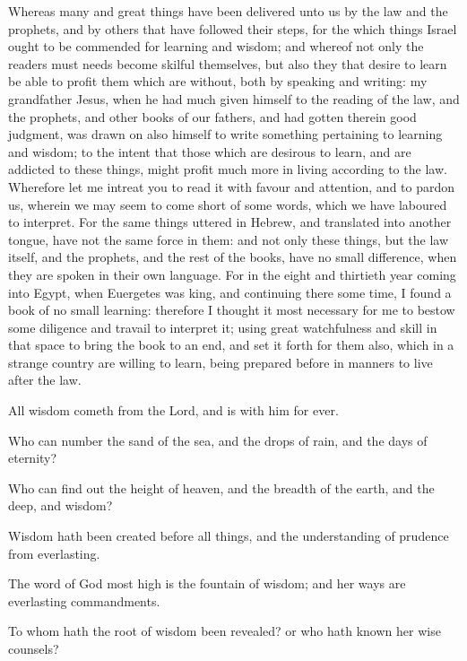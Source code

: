 {\par }{\PP Whereas many and great things have been delivered unto us by the law and the prophets, and by others that have followed their steps, for the which things Israel ought to be commended for learning and wisdom; and whereof not only the readers must needs become skilful themselves, but also they that desire to learn be able to profit them which are without, both by speaking and writing: my grandfather Jesus, when he had much given himself to the reading of the law, and the prophets, and other books of our fathers, and had gotten therein good judgment, was drawn on also himself to write something pertaining to learning and wisdom; to the intent that those which are desirous to learn, and are addicted to these things, might profit much more in living according to the law. Wherefore let me intreat you to read it with favour and attention, and to pardon us, wherein we may seem to come short of some words, which we have laboured to interpret. For the same things uttered in Hebrew, and translated into another tongue, have not the same force in them: and not only these things, but the law itself, and the prophets, and the rest of the books, have no small difference, when they are spoken in their own language. For in the eight and thirtieth year coming into Egypt, when Euergetes was king, and continuing there some time, I found a book of no small learning: therefore I thought it most necessary for me to bestow some diligence and travail to interpret it; using great watchfulness and skill in that space to bring the book to an end, and set it forth for them also, which in a strange country are willing to learn, being prepared before in manners to live after the law.
\par }{\PP {}All wisdom cometh from the Lord, and is with him for ever.
\par }{\PP {}Who can number the sand of the sea, and the drops of rain, and the days of eternity?
\par }{\PP {}Who can find out the height of heaven, and the breadth of the earth, and the deep, and wisdom?
\par }{\PP {}Wisdom hath been created before all things, and the understanding of prudence from everlasting.
\par }{\PP {}The word of God most high is the fountain of wisdom; and her ways are everlasting commandments.
\par }{\PP {}To whom hath the root of wisdom been revealed? or who hath known her wise counsels?
\par }{\PP {}
}
